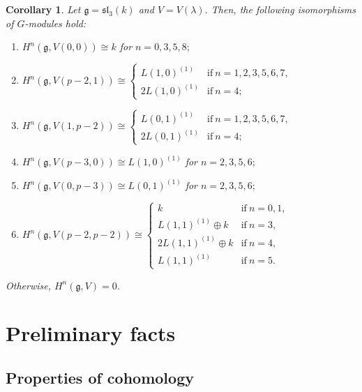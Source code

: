 \documentclass[10pt,a4paper]{amsart}
\numberwithin{equation}{section}
\newtheorem{Corollary}[Theorem]{Corollary}
\begin{document}
\begin{Corollary}\label{c3} Let $\mathfrak{g}=\mathfrak{sl}_3(k)$ and $V=V(\lambda)$. Then, the following isomorphisms of $G$-modules hold:

\begin{enumerate}\itemsep=0pt

\item[$(a)$] $H^n(\mathfrak{g},V(0,0))\cong k$ for $n=0,3,5,8;$

\item[$(b)$] $H^n(\mathfrak{g},V(p-2,1))\cong
\begin{cases}
L(1,0)^{(1)}&\text{if}\ n=1,2,3,5,6,7,
\\
2L(1,0)^{(1)}&\text{if}\ n=4;
\end{cases}$

\item[$(c)$] $H^n(\mathfrak{g},V(1,p-2))\cong
\begin{cases}
L(0,1)^{(1)}&\text{if}\ n=1,2,3,5,6,7,\\
2L(0,1)^{(1)}&\text{if}\ n=4;
\end{cases}$

\item[$(d)$] $H^n(\mathfrak{g},V(p-3,0))\cong L(1,0)^{(1)}$ for $n=2,3,5,6;$

\item[$(e)$] $H^n(\mathfrak{g},V(0,p-3))\cong L(0,1)^{(1)}$ for $n=2,3,5,6;$

\item[$(f)$] $H^n(\mathfrak{g},V(p-2,p-2))\cong
\begin{cases}
k&\text{if}\ n=0,1,\\
L(1,1)^{(1)}\oplus k&\text{if}\ n=3,\\
2L(1,1)^{(1)}\oplus k&\text{if}\ n=4,\\
L(1,1)^{(1)}&\text{if}\ n=5.
\end{cases}$
\end{enumerate}
Otherwise, $H^n(\mathfrak{g},V)=0$.
\end{Corollary}

\section{Preliminary facts}%

\subsection{Properties of cohomology}%
\end{document}
